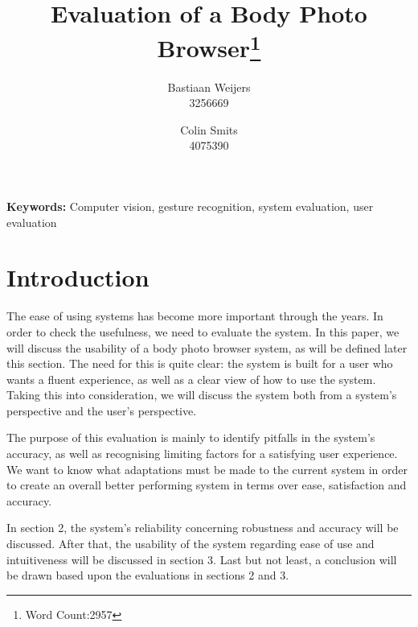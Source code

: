 \documentclass[11pt,a4paper]{article}
\author{Bastiaan Weijers \\ 3256669 \and Colin Smits \\ 4075390}
\title{Evaluation of a Body Photo Browser\footnote{Word Count:2957}}
\begin{document}
\maketitle
{}

\vspace{1cm}

\noindent \textbf{Keywords:} Computer vision, gesture recognition, system evaluation, user evaluation
 
\noindent\makebox[\linewidth]{\rule{\textwidth}{0.4pt}}

\section{Introduction}
The ease of using systems has become more important through the years. In order to check the usefulness, we need to evaluate the system. In this paper, we will discuss the usability of a body photo browser system, as will be defined later this section. The need for this is quite clear: the system is built for a user who wants a fluent experience, as well as a clear view of how to use the system. Taking this into consideration, we will discuss the system both from a system's perspective and the user's perspective.

The purpose of this evaluation is mainly to identify pitfalls in the system's accuracy, as well as recognising limiting factors for a satisfying user experience. We want to know what adaptations must be made to the current system in order to create an overall better performing system in terms over ease, satisfaction and accuracy.

In section 2, the system's reliability concerning robustness and accuracy will be discussed. After that, the usability of the system regarding ease of use and intuitiveness will be discussed in section 3. Last but not least, a conclusion will be drawn based upon the evaluations in sections 2 and 3.
\end{document}
